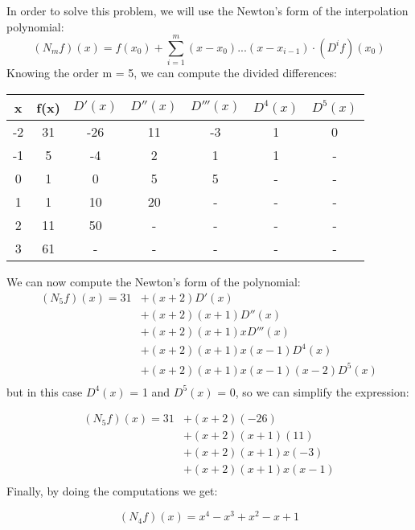 \documentclass{article}
\begin{document}
In order to solve this problem, we will use the Newton's form of the interpolation polynomial:
\[
    (N_mf)(x) = f(x_0) + \sum_{i=1}^{m} (x-x_0)...(x-x_{i-1}) \cdot (D^if)(x_0)
\]
Knowing the order m = 5, we can compute the divided differences:
\begin{center}
    \begin{tabular}{c c | c c c c c}
        x & f(x) & \(D'(x)\) & \(D''(x)\) & \(D'''(x)\) & \(D^4(x)\) & \(D^5(x)\) \\
        \hline
        -2 & 31 & -26 & 11 & -3 & 1 & 0 \\
        -1 & 5 & -4 & 2 & 1 & 1 & - \\
        0 & 1 & 0  & 5 & 5 & - & - \\
        1 & 1 & 10 & 20 & - & - & - \\
        2 & 11 & 50 & - & - & - & - \\
        3 & 61 & - & - & - & - & - \\
    \end{tabular}
\end{center}

We can now compute the Newton's form of the polynomial:
\begin{align*}
(N_5f)(x) = 31 & + (x+2)D'(x) \\
         & + (x+2)(x+1)D''(x) \\
         & + (x+2)(x+1)xD'''(x) \\
         & + (x+2)(x+1)x(x-1)D^4(x) \\
         & + (x+2)(x+1)x(x-1)(x-2)D^5(x) \\
\end{align*}
but in this case \(D^4(x)\) = 1 and \(D^5(x)\) = 0, so we can simplify the expression:

\begin{align*}
(N_5f)(x) = 31 & + (x+2)(-26) \\
         & + (x+2)(x+1)(11) \\
         & + (x+2)(x+1)x(-3) \\
         & + (x+2)(x+1)x(x-1) \\
\end{align*}
Finally, by doing the computations we get:

\[
    (N_4f)(x) = x^4-x^3+x^2-x+1
\]
\end{document}
